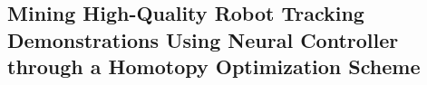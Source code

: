 \subsection{Mining High-Quality Robot Tracking Demonstrations Using Neural Controller through a Homotopy Optimization Scheme} 
\label{sec:method_data}
\vspace{-5pt}



